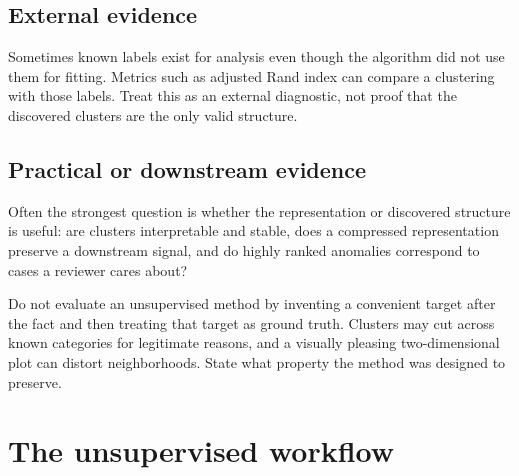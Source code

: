 \subsection{External evidence}
Sometimes known labels exist for analysis even though the algorithm did not use them for fitting. Metrics such as adjusted Rand index can compare a clustering with those labels. Treat this as an external diagnostic, not proof that the discovered clusters are the only valid structure.

\subsection{Practical or downstream evidence}
Often the strongest question is whether the representation or discovered structure is useful: are clusters interpretable and stable, does a compressed representation preserve a downstream signal, and do highly ranked anomalies correspond to cases a reviewer cares about?

\begin{pitfall}
Do not evaluate an unsupervised method by inventing a convenient target after the fact and then treating that target as ground truth. Clusters may cut across known categories for legitimate reasons, and a visually pleasing two-dimensional plot can distort neighborhoods. State what property the method was designed to preserve.
\end{pitfall}

\section{The unsupervised workflow}

\begin{mlfigure}
\end{mlfigure}

